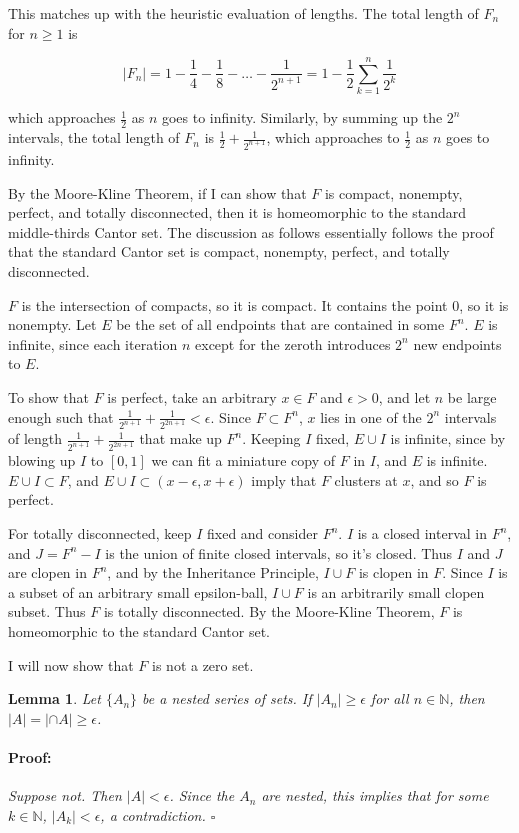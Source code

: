 \documentclass{article}
\newenvironment{proof}{\paragraph{Proof:}}{\hfill$\square$}
\newtheorem{lemma}[theorem]{Lemma}
\newcommand{\N}{\mathbb{N}}
\begin{document}
This matches up with the heuristic evaluation of lengths. The total length of $F_n$ for $n \geq 1$ is

\[
|F_n| = 1 - \frac{1}{4} - \frac{1}{8} - \dots - \frac{1}{2^{n+1}} = 1 - \frac{1}{2} \sum_{k=1}^n \frac{1}{2^k}
\]

which approaches $\frac{1}{2}$ as $n$ goes to infinity. Similarly, by summing up the $2^n$ intervals, the total length of $F_n$ is $\frac{1}{2} + \frac{1}{2^{n+1}}$, which approaches to $\frac{1}{2}$ as $n$ goes to infinity.

By the Moore-Kline Theorem, if I can show that $F$ is compact, nonempty, perfect, and totally disconnected, then it is homeomorphic to the standard middle-thirds Cantor set. The discussion as follows essentially follows the proof that the standard Cantor set is compact, nonempty, perfect, and totally disconnected.

$F$ is the intersection of compacts, so it is compact. It contains the point $0$, so it is nonempty. Let $E$ be the set of all endpoints that are contained in some $F^n$. $E$ is infinite, since each iteration $n$ except for the zeroth introduces $2^n$ new endpoints to $E$.

To show that $F$ is perfect, take an arbitrary $x \in F$ and $\epsilon > 0$, and let $n$ be large enough such that $\frac{1}{2^{n+1}} + \frac{1}{2^{2n+1}} < \epsilon$. Since $F \subset F^n$, $x$ lies in one of the $2^n$ intervals of length $\frac{1}{2^{n+1}} + \frac{1}{2^{2n+1}}$ that make up $F^n$. Keeping $I$ fixed, $E \cup I$ is infinite, since by blowing up $I$ to $[0, 1]$ we can fit a miniature copy of $F$ in $I$, and $E$ is infinite. $E \cup I \subset F$, and $E \cup I \subset (x - \epsilon, x + \epsilon)$ imply that $F$ clusters at $x$, and so $F$ is perfect.

For totally disconnected, keep $I$ fixed and consider $F^n$. $I$ is a closed interval in $F^n$, and $J = F^n - I$ is the union of finite closed intervals, so it's closed. Thus $I$ and $J$ are clopen in $F^n$, and by the Inheritance Principle, $I \cup F$ is clopen in $F$. Since $I$ is a subset of an arbitrary small epsilon-ball, $I \cup F$ is an arbitrarily small clopen subset. Thus $F$ is totally disconnected. By the Moore-Kline Theorem, $F$ is homeomorphic to the standard Cantor set.

I will now show that $F$ is not a zero set.

\begin{lemma}
Let $\{A_n\}$ be a nested series of sets. If $|A_n| \geq \epsilon$ for all $n \in \N$, then $|A| = |\cap A| \geq \epsilon$.
\begin{proof}
Suppose not. Then $|A| < \epsilon$. Since the $A_n$ are nested, this implies that for some $k \in \N$, $|A_k| < \epsilon$, a contradiction.
\end{proof}
\end{lemma}
\end{document}
